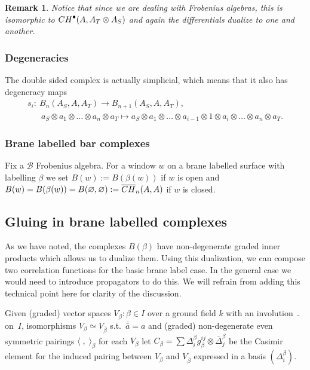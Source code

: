 \documentclass[11pt]{article}
\newtheorem{rmk}[thm]{Remark}
\def\calB{{\mathcal B}}
\def\la{\langle}
\def\ra{\rangle}
\def\oto{\otimes \dots \otimes}
\begin{document}
\begin{rmk}
Notice that since we are dealing with Frobenius algebras, this is
isomorphic to  ${\rm CH}^{\bullet}(A,A_T\otimes A_S)$ and again the
dif\/ferentials dualize to one and another.
\end{rmk}

\subsubsection{Degeneracies}
The double sided complex is actually simplicial,
which means that it also has degeneracy maps
\begin{gather*}
s_i: \ B_n(A_S,A,A_T) \to B_{n+1}(A_S,A,A_T), \\
\phantom{s_i:} \ \ a_S\otimes a_1 \oto a_n \otimes a_T \mapsto a_S\otimes a_1 \oto
a_{i-1}\otimes  1 \otimes a_i \oto a_n \otimes a_T.
\end{gather*}

\subsubsection{Brane labelled  bar complexes}

Fix a $\calB$ Frobenius algebra. For a window $w$ on a brane
labelled surface with labelling $\beta$ we set $B(w):=B(\beta (w))$
if $w$ is open and
$B(w)=B(\beta(w))=B(\varnothing,\varnothing):=\overline{\rm CH}_n(A,A)$ if $w$ is
closed.

\subsection{Gluing in brane labelled complexes}

As we have noted, the complexes $B(\beta)$ have non-degenerate
graded inner products which allows us to dualize them.
 Using this
dualization, we can compose two correlation functions for the basic
brane label case. In the general case we would need to introduce
propagators to do this. We will refrain from adding this technical
point here for clarity of the discussion.

Given  (graded) vector spaces $V_{\beta}: \beta\in I$ over a ground
f\/ield $k$ with an involution~$\bar{}$ on~$I$, isomorphisms
$V_{\beta}\simeq V_{\bar\beta}$ s.t.\ $\bar{\bar{a}}=a$ and (graded)
non-degenerate even symmetric pairings $\la\;,\;\ra_{\beta}$ for
each $V_{\beta}$
 let $C_{\beta}=\sum
\Delta^{\beta}_i g^{ij}_{\beta} \otimes \bar\Delta^{\beta}_j$ be the
Casimir element for the induced pairing between $V_{\beta}$ and
$V_{\bar\beta}$ expressed in a basis $(\Delta^{\beta}_i)$.
\end{document}
